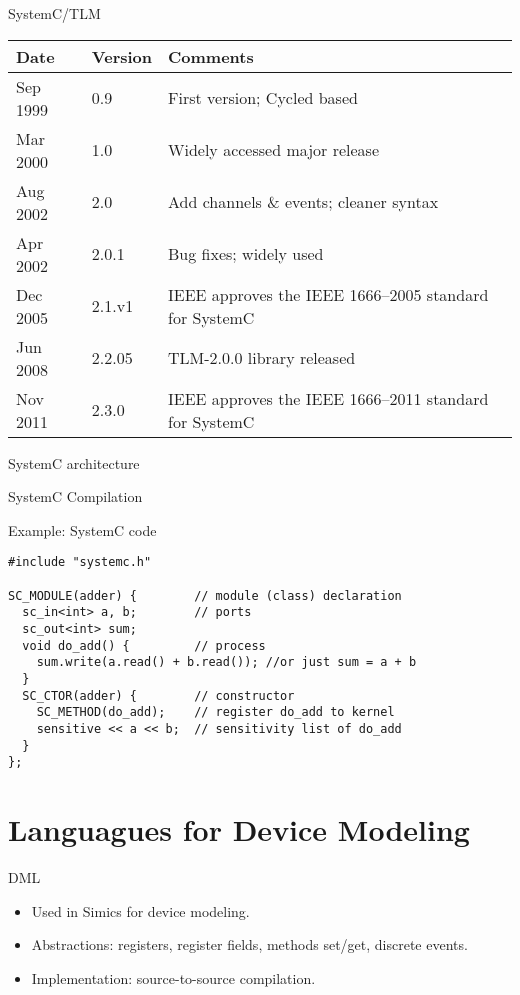 \begin{frame}{SystemC/TLM}
  \begin{tabular}{llp{6cm}}
    Date     & Version & Comments \\
    \hline
    Sep 1999 & 0.9     & First version; Cycled based \\
    Mar 2000 & 1.0     &  Widely accessed major release \\
    Aug 2002 & 2.0     & Add channels \& events; cleaner syntax \\
    Apr 2002 & 2.0.1   & Bug fixes; widely used \\
    Dec 2005 & 2.1.v1  & IEEE approves the IEEE 1666–2005 standard for SystemC \\
    Jun 2008 & 2.2.05  & TLM-2.0.0 library released  \\
    Nov 2011 & 2.3.0   & IEEE approves the IEEE 1666–2011 standard for SystemC \\
  \end{tabular}
\end{frame}

\begin{frame}{SystemC architecture}
  \centering
\end{frame}

\begin{frame}{SystemC Compilation}
  \centering
\end{frame}


\begin{frame}[fragile]{Example: SystemC code}
  \begin{lstlisting}[basicstyle=\footnotesize]
#include "systemc.h"

SC_MODULE(adder) {        // module (class) declaration
  sc_in<int> a, b;        // ports
  sc_out<int> sum;
  void do_add() {         // process
    sum.write(a.read() + b.read()); //or just sum = a + b
  }
  SC_CTOR(adder) {        // constructor
    SC_METHOD(do_add);    // register do_add to kernel
    sensitive << a << b;  // sensitivity list of do_add
  }
};
  \end{lstlisting}
\end{frame}

\section{Languagues for Device Modeling}

\begin{frame}{DML}
  \begin{itemize}
    \item Used in Simics for device modeling.
    \item Abstractions: registers, register fields, methods set/get,
      discrete events.
    \item Implementation: source-to-source compilation.
  \end{itemize}
\end{frame}

